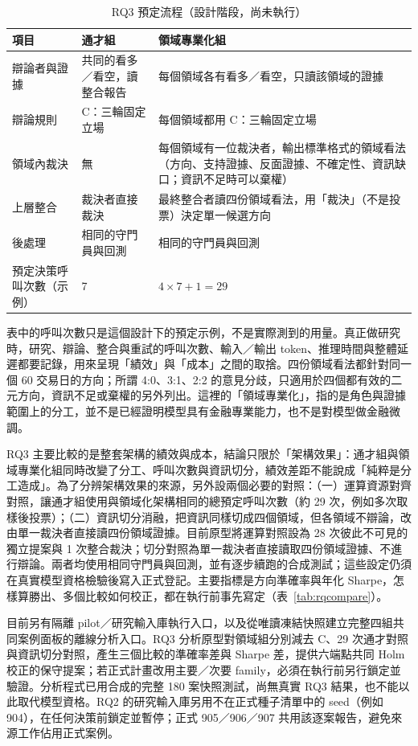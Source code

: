 \documentclass[12pt,a4paper]{article}
\numberwithin{table}{section}
\numberwithin{figure}{section}
\begin{document}
\begin{table}[H]\centering\small
\caption{RQ3 預定流程（設計階段，尚未執行）}
\label{tab:rq3flow}
\begin{tabularx}{\textwidth}{@{}L{.17} Y Y@{}}\toprule
項目 & 通才組 & 領域專業化組 \\\midrule
辯論者與證據 & 共同的看多／看空，讀整合報告 & 每個領域各有看多／看空，只讀該領域的證據 \\
辯論規則 & C：三輪固定立場 & 每個領域都用 C：三輪固定立場 \\
領域內裁決 & 無 & 每個領域有一位裁決者，輸出標準格式的領域看法（方向、支持證據、反面證據、不確定性、資訊缺口；資訊不足時可以棄權） \\
上層整合 & 裁決者直接裁決 & 最終整合者讀四份領域看法，用「裁決」（不是投票）決定單一候選方向 \\
後處理 & 相同的守門員與回測 & 相同的守門員與回測 \\
預定決策呼叫次數（示例） & 7 & $4\times7+1=29$ \\
\bottomrule\end{tabularx}\end{table}

表中的呼叫次數只是這個設計下的預定示例，不是實際測到的用量。真正做研究時，研究、辯論、整合與重試的呼叫次數、輸入／輸出 token、推理時間與整體延遲都要記錄，用來呈現「績效」與「成本」之間的取捨。四份領域看法都針對同一個 60 交易日的方向；所謂 4:0、3:1、2:2 的意見分歧，只適用於四個都有效的二元方向，資訊不足或棄權的另外列出。這裡的「領域專業化」，指的是角色與證據範圍上的分工，並不是已經證明模型具有金融專業能力，也不是對模型做金融微調。

RQ3 主要比較的是整套架構的績效與成本，結論只限於「架構效果」：通才組與領域專業化組同時改變了分工、呼叫次數與資訊切分，績效差距不能說成「純粹是分工造成」。為了分辨架構效果的來源，另外設兩個必要的對照：（一）運算資源對齊對照，讓通才組使用與領域化架構相同的總預定呼叫次數（約 29 次，例如多次取樣後投票）；（二）資訊切分消融，把資訊同樣切成四個領域，但各領域不辯論，改由單一裁決者直接讀四份領域證據。目前原型將運算對照設為 28 次彼此不可見的獨立提案與 1 次整合裁決；切分對照為單一裁決者直接讀取四份領域證據、不進行辯論。兩者均使用相同守門員與回測，並有逐步續跑的合成測試；這些設定仍須在真實模型資格檢驗後寫入正式登記。主要指標是方向準確率與年化 Sharpe，怎樣算勝出、多個比較如何校正，都在執行前事先寫定（表~\ref{tab:rqcompare}）。

目前另有隔離 pilot／研究輸入庫執行入口，以及從唯讀凍結快照建立完整四組共同案例面板的離線分析入口。RQ3 分析原型對領域組分別減去 C、29 次通才對照與資訊切分對照，產生三個比較的準確率差與 Sharpe 差，提供六端點共同 Holm 校正的保守提案；若正式計畫改用主要／次要 family，必須在執行前另行鎖定並驗證。分析程式已用合成的完整 180 案快照測試，尚無真實 RQ3 結果，也不能以此取代模型資格。RQ2 的研究輸入庫另用不在正式種子清單中的 seed（例如 904），在任何決策前鎖定並暫停；正式 905／906／907 共用該逐案報告，避免來源工作佔用正式案例。
\end{document}
